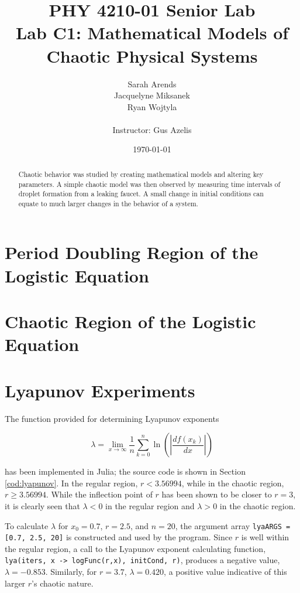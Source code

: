 \documentclass[a4paper]{article}
\title{PHY 4210-01 Senior Lab \\Lab C1:  Mathematical Models of Chaotic Physical Systems }
\author{Sarah Arends \\
        Jacquelyne Miksanek \\
        Ryan Wojtyla \\ \\
        Instructor: Gus Azelis}
\date{\today}
\begin{document}
\maketitle

\begin{abstract}
\qq Chaotic behavior was studied by creating mathematical models and altering key parameters. A simple chaotic model was then observed by measuring time intervals of droplet formation from a leaking faucet. A small change in initial conditions can equate to much larger changes in the behavior of a system.

\end{abstract}

\newpage

\tableofcontents

\newpage

\section{Period Doubling Region of the Logistic Equation}

\section{Chaotic Region of the Logistic Equation}

\section{Lyapunov Experiments}

\qq The function provided for determining Lyapunov exponents

\begin{equation*}
  \lambda = \lim\limits_{x \rightarrow \infty} \frac{1}{n} \sum^n_{k=0} 
  \ln \left( \left| \frac{d f(x_k)}{dx} \right| \right)
\end{equation*}

has been implemented in Julia; the source code is shown in Section
\ref{cod:lyapunov}. In the regular region, \( r < 3.56994 \), while in the
chaotic region, \( r \geq 3.56994 \). While the inflection point of \( r \) has
been shown to be closer to \( r = 3 \), it is clearly seen that \( \lambda < 0
\) in the regular region and \( \lambda > 0 \) in the chaotic region.

\qq To calculate \( \lambda \) for \( x_0 = 0.7 \), \( r = 2.5 \), and \( n = 20
\), the argument array {\tt lyaARGS = [0.7, 2.5, 20]} is constructed and used by
the program. Since \( r \) is well within the regular region, a call to the
Lyapunov exponent calculating function, {\tt lya(iters, x -> logFunc(r,x),
  initCond, r)}, produces a negative value, \( \lambda = -0.853 \). Similarly,
for \( r = 3.7 \), \( \lambda = 0.420 \), a positive value indicative of this
larger \( r \)'s chaotic nature. 
\end{document}
